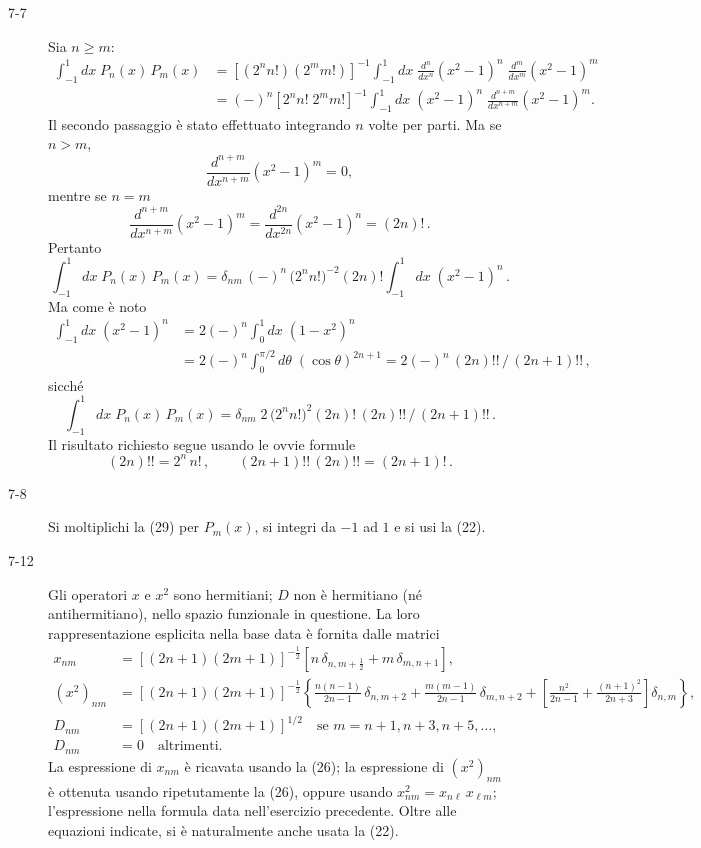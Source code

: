 \documentclass[11pt, a4paper]{book}
\numberwithin{equation}{section}
\begin{document}
\begin{description}
\item[7-7] Sia $n\geq m$:
\begin{align*}
  \int_{-1}^{1} dx\; P_n(x)\,P_m(x)
  &= \left[(2^n n!)(2^m m!)\right]^{-1}
    \int_{-1}^{1} dx\;\frac{d^n}{dx^n}(x^2-1)^n\;\frac{d^m}{dx^m}(x^2-1)^m\\
  &= (-)^n\left[2^n n!\;2^m m!\right]^{-1}
    \int_{-1}^{1} dx\;(x^2-1)^n\;\frac{d^{n+m}}{dx^{n+m}}(x^2-1)^m.
\end{align*}
Il secondo passaggio è stato effettuato integrando $n$ volte per parti. Ma se $n>m$,
\[
  \frac{d^{n+m}}{dx^{n+m}}(x^2-1)^m = 0,
\]
mentre se $n=m$
\[
  \frac{d^{n+m}}{dx^{n+m}}(x^2-1)^m = \frac{d^{2n}}{dx^{2n}}(x^2-1)^n = (2n)!\,.
\]
Pertanto
\[
  \int_{-1}^{1} dx\; P_n(x)\,P_m(x)
  = \delta_{nm}\,(-)^n\,\bigl(2^n n!\bigr)^{-2}(2n)!\int_{-1}^{1} dx\;(x^2-1)^n\,.
\]
Ma come è noto
\begin{align*}
  \int_{-1}^{1} dx\;(x^2-1)^n
  &= 2(-)^n \int_{0}^{1} dx\;(1-x^2)^n\\
  &= 2(-)^n \int_{0}^{\pi/2} d\theta\;(\cos\theta)^{2n+1}
  = 2(-)^n\,(2n)!!\,/\,(2n+1)!!\,,
\end{align*}
sicché
\[
  \int_{-1}^{1} dx\; P_n(x)\,P_m(x)
  = \delta_{nm}\;2\,\bigl(2^n n!\bigr)^2 (2n)!\,(2n)!!\,/\,(2n+1)!!\,.
\]
Il risultato richiesto segue usando le ovvie formule
\[
  (2n)!! = 2^n\,n!\,,\qquad (2n+1)!!\,(2n)!! = (2n+1)!\,.
\]

\item[7-8] Si moltiplichi la (29) per $P_m(x)$, si integri da $-1$ ad $1$ e si usi la (22).

\item[7-12] Gli operatori $x$ e $x^2$ sono hermitiani; $D$ non è hermitiano (né antihermitiano), nello spazio funzionale in questione. La loro rappresentazione esplicita nella base data è fornita dalle matrici
\begin{align*}
  x_{nm} &= \left[(2n+1)(2m+1)\right]^{-\frac{1}{2}}
    \left[n\,\delta_{n,m+\frac{1}{2}} + m\,\delta_{m,n+1}\right], %
  \\[4pt]
  (x^2)_{nm} &= \left[(2n+1)(2m+1)\right]^{-\frac{1}{2}}
    \left\{\frac{n(n-1)}{2n-1}\,\delta_{n,m+2}
    + \frac{m(m-1)}{2n-1}\,\delta_{m,n+2} %
    + \left[\frac{n^2}{2n-1}+\frac{(n+1)^2}{2n+3}\right]\delta_{n,m}\right\},
  \\[4pt]
  D_{nm} &= \left[(2n+1)(2m+1)\right]^{1/2}\quad\text{se } m=n+1,n+3,n+5,\ldots,\\
  D_{nm} &= 0\quad\text{altrimenti}.
\end{align*}
La espressione di $x_{nm}$ è ricavata usando la (26); la espressione di $(x^2)_{nm}$ è ottenuta usando ripetutamente la (26), oppure usando $x^2_{nm} = x_{n\ell}\,x_{\ell m}$; l'espressione nella formula data nell'esercizio precedente. Oltre alle equazioni indicate, si è naturalmente anche usata la (22).


\end{description}
\end{document}
